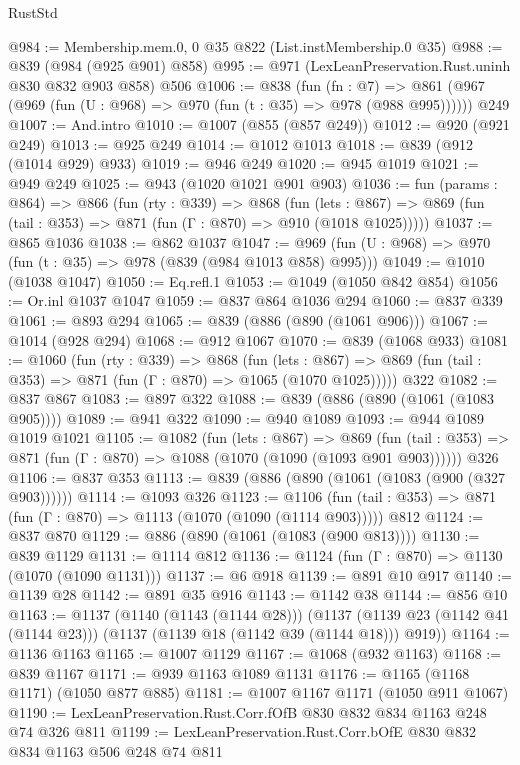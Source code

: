 \begin{lexlean}{RustStd}
\begin{coremodule}
@984 := Membership.mem.{0, 0} @35 @822 (List.instMembership.{0} @35)
@988 := @839 (@984 (@925 @901) @858)
@995 := @971 (LexLeanPreservation.Rust.uninh @830 @832 @903 @858) @506
@1006 := @838
    (fun (fn : @7) =>
    @861 (@967 (@969 (fun (U : @968) => @970 (fun (t : @35) => @978 (@988 @995))))))
    @249
@1007 := And.intro
@1010 := @1007 (@855 (@857 @249))
@1012 := @920 (@921 @249)
@1013 := @925 @249
@1014 := @1012 @1013
@1018 := @839 (@912 (@1014 @929) @933)
@1019 := @946 @249
@1020 := @945 @1019
@1021 := @949 @249
@1025 := @943 (@1020 @1021 @901 @903)
@1036 := fun (params : @864) =>
  @866
    (fun (rty : @339) =>
    @868
      (fun (lets : @867) =>
      @869 (fun (tail : @353) => @871 (fun (Γ : @870) => @910 (@1018 @1025)))))
@1037 := @865 @1036
@1038 := @862 @1037
@1047 := @969 (fun (U : @968) => @970 (fun (t : @35) => @978 (@839 (@984 @1013 @858) @995)))
@1049 := @1010 (@1038 @1047)
@1050 := Eq.refl.{1}
@1053 := @1049 (@1050 @842 @854)
@1056 := Or.inl @1037 @1047
@1059 := @837 @864 @1036 @294
@1060 := @837 @339
@1061 := @893 @294
@1065 := @839 (@886 (@890 (@1061 @906)))
@1067 := @1014 (@928 @294)
@1068 := @912 @1067
@1070 := @839 (@1068 @933)
@1081 := @1060
    (fun (rty : @339) =>
    @868
      (fun (lets : @867) =>
      @869 (fun (tail : @353) => @871 (fun (Γ : @870) => @1065 (@1070 @1025)))))
    @322
@1082 := @837 @867
@1083 := @897 @322
@1088 := @839 (@886 (@890 (@1061 (@1083 @905))))
@1089 := @941 @322
@1090 := @940 @1089
@1093 := @944 @1089 @1019 @1021
@1105 := @1082
    (fun (lets : @867) =>
    @869 (fun (tail : @353) => @871 (fun (Γ : @870) => @1088 (@1070 (@1090 (@1093 @901 @903))))))
    @326
@1106 := @837 @353
@1113 := @839 (@886 (@890 (@1061 (@1083 (@900 (@327 @903))))))
@1114 := @1093 @326
@1123 := @1106
    (fun (tail : @353) => @871 (fun (Γ : @870) => @1113 (@1070 (@1090 (@1114 @903)))))
    @812
@1124 := @837 @870
@1129 := @886 (@890 (@1061 (@1083 (@900 @813))))
@1130 := @839 @1129
@1131 := @1114 @812
@1136 := @1124 (fun (Γ : @870) => @1130 (@1070 (@1090 @1131)))
@1137 := @6 @918
@1139 := @891 @10 @917
@1140 := @1139 @28
@1142 := @891 @35 @916
@1143 := @1142 @38
@1144 := @856 @10
@1163 := @1137
    (@1140 (@1143 (@1144 @28)))
    (@1137 (@1139 @23 (@1142 @41 (@1144 @23))) (@1137 (@1139 @18 (@1142 @39 (@1144 @18))) @919))
@1164 := @1136 @1163
@1165 := @1007 @1129
@1167 := @1068 (@932 @1163)
@1168 := @839 @1167
@1171 := @939 @1163 @1089 @1131
@1176 := @1165 (@1168 @1171) (@1050 @877 @885)
@1181 := @1007 @1167 @1171 (@1050 @911 @1067)
@1190 := LexLeanPreservation.Rust.Corr.fOfB @830 @832 @834 @1163 @248 @74 @326 @811
@1199 := LexLeanPreservation.Rust.Corr.bOfE @830 @832 @834 @1163 @506 @248 @74 @811

\end{coremodule}
\end{lexlean}
